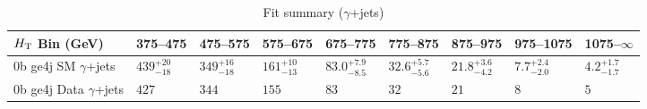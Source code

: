 \documentclass[8pt]{article}
\def\scalht{\mbox{$H_{\rm{T}}$}\xspace}
\newcommand\T{\rule{0pt}{2.6ex}}
\begin{document}
\begin{table}[ht!]
\caption{Fit summary ($\gamma$+jets)}
\label{tab:ensemble-summary}
\centering
\begin{tabular}{ lllllllll }

\hline
\scalht Bin (GeV)       & 375--475                       & 475--575                       & 575--675                       & 675--775                       & 775--875                       & 875--975                       & 975--1075                      & 1075--$\infty$                 \\ [1.000000ex]
\hline
0b ge4j SM $\gamma$+jets\T & $439^{+20}_{-18}$              & $349^{+16}_{-18}$              & $161^{+10}_{-13}$              & $83.0^{+7.9}_{-8.5}$           & $32.6^{+5.7}_{-5.6}$           & $21.8^{+3.6}_{-4.2}$           & $7.7^{+2.4}_{-2.0}$            & $4.2^{+1.7}_{-1.7}$            \\ 
0b ge4j Data $\gamma$+jets\T & $427$                          & $344$                          & $155$                          & $83$                           & $32$                           & $21$                           & $8$                            & $5$                            \\ 
\hline

\end{tabular}
\end{table}
\end{document}
